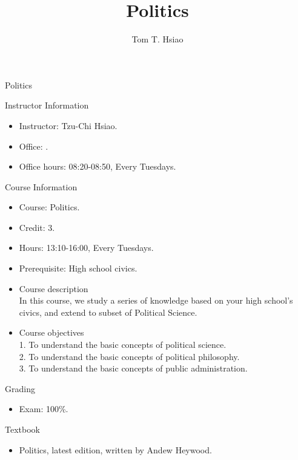 \documentclass{article}
\title{Politics}
\author{Tom T. Hsiao}
\date{}
\begin{document}
\begin{center}
\fontsize{16pt}{16pt}\selectfont Politics \\
\end{center}
\fontsize{14pt}{14pt}\selectfont
\begin{flushleft}
Instructor Information
\end{flushleft}
\begin{itemize}
\item Instructor: Tzu-Chi Hsiao. \\
\item Office: . \\
\item Office hours: 08:20-08:50, Every Tuesdays. \\
\end{itemize}
Course Information \\
\begin{itemize}
\item Course: Politics. \\
\item Credit: 3. \\
\item Hours: 13:10-16:00, Every Tuesdays. \\
\item Prerequisite: High school civics. \\
\item Course description \\
In this course, we study a series of knowledge based on your high school's civics, and extend to subset of Political Science. \\ 
\item Course objectives \\
1. To understand the basic concepts of political science. \\
2. To understand the basic concepts of political philosophy. \\
3. To understand the basic concepts of public administration. \\
\end{itemize}
\begin{flushleft}
Grading \\
\end{flushleft}
\begin{itemize}
\item Exam: 100\%. \\
\end{itemize}
Textbook \\
\begin{itemize}
\item Politics, latest edition, written by Andew Heywood. \\
\end{itemize}
\end{document}
